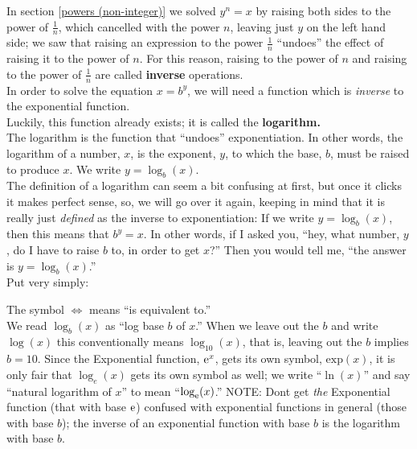 \noindent In section \ref{powers (non-integer)} we solved $y^n = x$ by raising both sides to the power of $\frac{1}{n}$, which cancelled with the power $n$, leaving just $y$ on the left hand side; we saw that raising an expression to the power $\frac{1}{n}$ ``undoes'' the effect of raising it to the power of $n$. For this reason, raising to the power of $n$ and raising to the power of $\frac{1}{n}$ are called \textbf{inverse} operations. \label{inverse operations.} \\

\noindent In order to solve the equation $x = b^y$, we will need a function which is \textit{inverse} to the exponential function. \\

\noindent Luckily, this function already exists; it is called the \textbf{logarithm.} \\

\noindent The logarithm is the function that ``undoes'' exponentiation. In other words, the logarithm of a number, $x$, is the exponent, $y$, to which the base, $b$, must be raised to produce $x$. We write $y = \log_b(x)$. \\

\noindent The definition of a logarithm can seem a bit confusing at first, but once it clicks it makes perfect sense, so, we will go over it again, keeping in mind that it is really just \textit{defined} as the inverse to exponentiation: If we write $y = \log_b(x)$, then this means that $b^y = x$. In other words, if I asked you, ``hey, what number, $y$, do I have to raise $b$ to, in order to get $x$?'' Then you would tell me, ``the answer is $y = \log_b(x)$.'' \\

\noindent Put very simply: 

	\bigskip
	
	\hfil{}
	\bigskip
	
\noindent The symbol $\iff$ means ``is equivalent to.'' \label{symbiff} \\

\noindent We read $\log_b(x)$ as ``log base $b$ of $x$.'' When we leave out the $b$ and write $\log(x)$ this conventionally means $\log_{10}(x)$, that is, leaving out the $b$ implies $b = 10$. Since the Exponential function, $\mathrm{e}^x$, gets its own symbol, $\text{exp}(x)$, it is only fair that $\log_e(x)$ gets its own symbol as well; we write ``$\ln(x)$'' and say ``natural logarithm of $x$'' to mean ``$\log_{\mathrm{e}}(x)$.'' NOTE: Dont get \textit{the} Exponential function (that with base $\mathrm{e}$) confused with exponential functions in general (those with base $b$); the inverse of an exponential function with base $b$ is the logarithm with base $b$. \\

